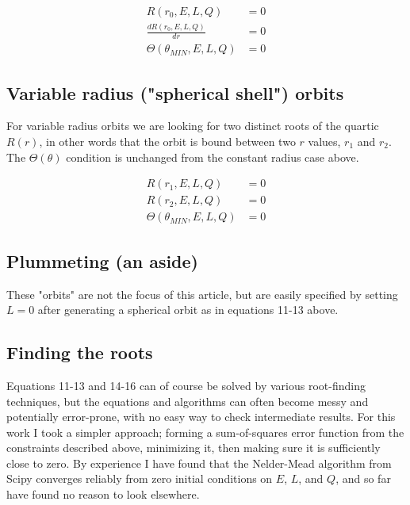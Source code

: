 \documentclass[11pt]{article}
\begin{document}
\begin{align}
R(r_0, E, L, Q) &= 0 \\
\frac{d R(r_0, E, L, Q)}{d r} &= 0 \\
\Theta(\theta_{MIN}, E, L, Q) &= 0
\end{align}

\subsection{Variable radius ("spherical shell") orbits}

For variable radius orbits we are looking for two distinct roots of the quartic $R(r)$, in other words that the orbit is bound between two $r$ values, $r_1$ and $r_2$.  The $\Theta (\theta)$ condition is unchanged from the constant radius case above.

\begin{align}
R(r_1, E, L, Q) &= 0 \\
R(r_2, E, L, Q) &= 0 \\
\Theta(\theta_{MIN}, E, L, Q) &= 0
\end{align}

\subsection{Plummeting (an aside)}

These "orbits" are not the focus of this article, but are easily specified by setting $L = 0$ after generating a spherical orbit as in equations 11-13 above.

\subsection{Finding the roots}

Equations 11-13 and 14-16 can of course be solved by various root-finding techniques, but the equations and algorithms can often become messy and potentially error-prone, with no easy way to check intermediate results.  For this work I took a simpler approach; forming a sum-of-squares error function from the constraints described above, minimizing it, then making sure it is sufficiently close to zero.  By experience I have found that the Nelder-Mead algorithm from Scipy converges reliably from zero initial conditions on $E$, $L$, and $Q$, and so far have found no reason to look elsewhere.
\end{document}
